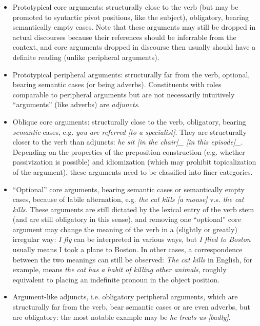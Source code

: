 \documentclass[a4paper, oneside, 12pt]{report}
\newcommand*{\term}[1]{\emph{#1}}
\newcommand{\form}[1]{\emph{#1}}
\begin{document}
\begin{table}[H]
    \caption{Classification of arguments}
    \label{tbl:argument-classification-general}
    \begin{itemize}
        \item Prototypical core arguments: 
        structurally close to the verb
        (but may be promoted to syntactic pivot positions, like the subject),
        obligatory, bearing semantically empty cases.
        Note that these arguments may still be dropped in actual discourses
        because their references should be inferrable from the context,
        and core arguments dropped in discourse then usually should have a definite reading
        (unlike peripheral arguments).
        \item Prototypical peripheral arguments:
        structurally far from the verb,
        optional, bearing semantic cases (or being adverbs).
        Constituents with roles comparable to peripheral arguments 
        but are not necessarily intuitively ``arguments'' (like adverbs)
        are \term{adjuncts}.
        \item Oblique core arguments:
        structurally close to the verb,
        obligatory, bearing \emph{semantic} cases,
        e.g. \form{you are referred [to a specialist]}.
        They are structurally closer to the verb than adjuncts:
        \form{he sit [in the chair]_{} [in this episode]_{\text{adjunct}}}.
        Depending on the properties of the preposition construction
        (e.g. whether passivization is possible)
        and idiomization (which may prohibit topicalization of the argument),
        these arguments need to be classified into finer categories.
        \item ``Optional'' core arguments, bearing semantic cases or semantically empty cases,
        because of labile alternation,
        e.g. \form{the cat kills [a mouse]} v.s. \form{the cat kills}.
        These arguments are still dictated by the lexical entry of the verb stem
        (and are still obligatory in this sense),
        and removing one ``optional''  core argument
        may change the meaning of the verb in a (slightly or greatly) irregular way:
        \form{I fly} can be interpreted in various ways,
        but \form{I flied to Boston} usually means I took a plane to Boston.
        In other cases, a correspondence between the two meanings can still be observed:
        \form{The cat kills} in English, for example, 
        means \form{the cat has a habit of killing other animals},
        roughly equivalent to placing an indefinite pronoun in the object position.
        \item Argument-like adjuncts, i.e. obligatory peripheral arguments, 
        which are structurally far from the verb,
        bear semantic cases or are even adverbs,
        but are obligatory:
        the most notable example may be \form{he treats us [badly]}.
    \end{itemize}
\end{table}
\end{document}
